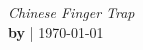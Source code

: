 \documentclass[letterpaper]{article}
\begin{document}
   \noindent
   \Large{\emph{Chinese Finger Trap}} \\%
   \normalsize %
   \textbf{by } | \today \\ %
   \vspace{1mm} %
   \hrulefill \\ %
\\


\end{document}
